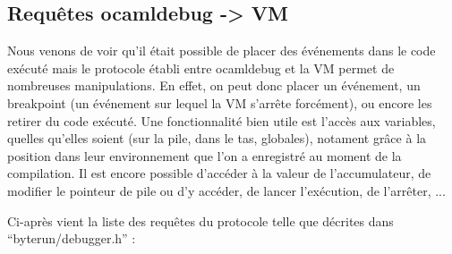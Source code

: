 \documentclass[11pt,a4paper]{report}
\begin{document}
\medskip

\subsection{Requêtes ocamldebug -> VM}

Nous venons de voir qu'il était possible de placer des événements dans le code exécuté mais le protocole établi entre ocamldebug et la VM permet de nombreuses manipulations. En effet, on peut donc placer un événement, un breakpoint (un événement sur lequel la VM s'arrête forcément), ou encore les retirer du code exécuté. Une fonctionnalité bien utile est l'accès aux variables, quelles qu'elles soient (sur la pile, dans le tas, globales), notament grâce à la position dans leur environnement que l'on a enregistré au moment de la compilation. Il est encore possible d'accéder à la valeur de l'accumulateur, de modifier le pointeur de pile ou d'y accéder, de lancer l'exécution, de l'arrêter, ...

\smallskip

Ci-après vient la liste des requêtes du protocole telle que décrites dans ``byterun/debugger.h'' :

\medskip
\end{document}
